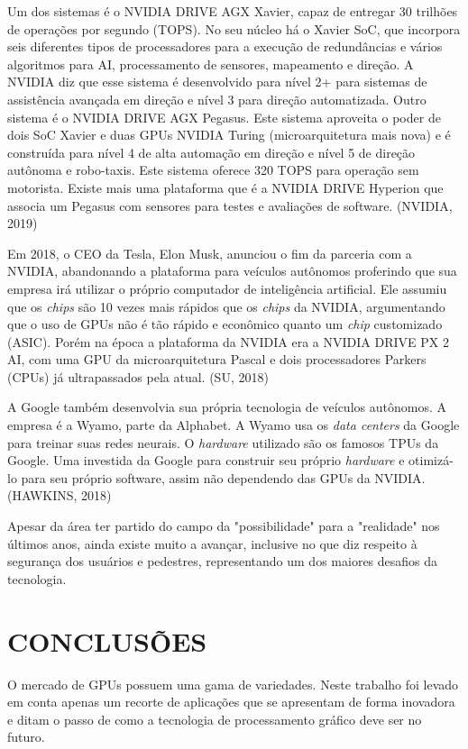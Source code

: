 \documentclass[letterpaper, 10 pt, conference]{ieeeconf}  %
\begin{document}
Um dos sistemas é o NVIDIA DRIVE AGX Xavier, capaz de entregar 30 trilhões de operações por segundo (TOPS). No seu núcleo há o Xavier SoC, que incorpora seis diferentes tipos de processadores para a execução de redundâncias e vários algoritmos para AI, processamento de sensores, mapeamento e direção. A NVIDIA diz que esse sistema é desenvolvido para nível 2+ para sistemas de assistência avançada em direção e nível 3 para direção automatizada. Outro sistema é o NVIDIA DRIVE AGX Pegasus. Este sistema aproveita o poder de dois SoC Xavier e duas GPUs NVIDIA Turing (microarquitetura mais nova) e é construída para nível 4 de alta automação em direção e nível 5 de direção autônoma e robo-taxis. Este sistema oferece 320 TOPS para operação sem motorista. Existe mais uma plataforma que é a NVIDIA DRIVE Hyperion que associa um Pegasus com sensores para testes e avaliações de software. (NVIDIA, 2019)

Em 2018, o CEO da Tesla, Elon Musk, anunciou o fim da parceria com a NVIDIA, abandonando a plataforma para veículos autônomos proferindo que sua empresa irá utilizar o próprio computador de inteligência artificial. Ele assumiu que os \textit{chips} são 10 vezes mais rápidos que os \textit{chips} da NVIDIA, argumentando que o uso de GPUs não é tão rápido e econômico quanto um \textit{chip} customizado (ASIC). Porém na época a plataforma da NVIDIA era a NVIDIA DRIVE PX 2 AI, com uma GPU da microarquitetura Pascal e dois processadores Parkers (CPUs) já ultrapassados pela atual. (SU, 2018)

A Google também desenvolvia sua própria tecnologia de veículos autônomos. A empresa é a Wyamo, parte da Alphabet. A Wyamo usa os \textit{data centers} da Google para treinar suas redes neurais. O\textit{ hardware} utilizado são os famosos TPUs da Google. Uma investida da Google para construir seu próprio \textit{hardware} e otimizá-lo para seu próprio software, assim não dependendo das GPUs da NVIDIA. (HAWKINS, 2018)

Apesar da área ter partido do campo da "possibilidade" para a "realidade" nos últimos anos, ainda existe muito a avançar, inclusive no que diz respeito à segurança dos usuários e pedestres, representando um dos maiores desafios da tecnologia. 

\section{CONCLUSÕES}

O mercado de GPUs possuem uma gama de variedades. Neste trabalho foi levado em conta apenas um recorte de aplicações que se apresentam de forma inovadora e ditam o passo de como a tecnologia de processamento gráfico deve ser no futuro.
\end{document}
